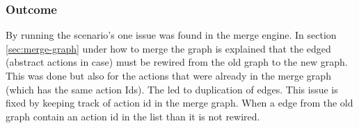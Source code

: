 \subsubsection{Outcome}
By running the scenario's one issue was found in the merge engine. In section \ref{sec:merge-graph} under how to merge the graph is explained that the edged (abstract actions in \testar case) must be rewired from the old graph to the new graph. This was done but also for the actions that were already in the merge graph (which has the same action Ids). The led to duplication of edges. This issue is fixed by keeping track of action id in the merge graph. When a edge from the old graph contain an action id in the list than it is not rewired.


